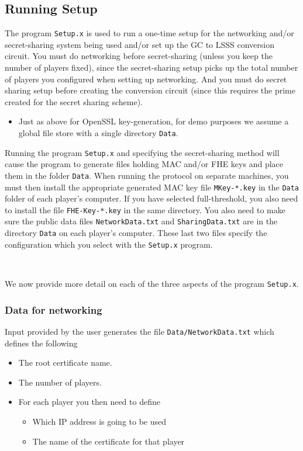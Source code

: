 \subsection{Running Setup}
The program \verb+Setup.x+ is used to run a one-time setup 
for the networking and/or secret-sharing system being used
and/or set up the GC to LSSS conversion circuit.
You must do networking before secret-sharing (unless you keep
the number of players fixed), since the secret-sharing setup
picks up the total number of players you configured when setting
up networking.
And you must do secret sharing setup before creating the conversion
circuit (since this requires the prime created for the secret
sharing scheme).
\begin{itemize}
\item Just as above for OpenSSL key-generation, for demo purposes we assume
a global file store with a single directory \verb+Data+.
\end{itemize}
Running the program \verb+Setup.x+ and specifying the secret-sharing
method will cause the program to generate files holding MAC and/or FHE
keys and place them in the folder \verb+Data+.  When running the
protocol on separate machines, you must then install the appropriate
generated MAC key file \verb+MKey-*.key+ in the \verb+Data+ folder of
each player's computer.  If you have selected full-threshold, you also
need to install the file \verb+FHE-Key-*.key+ in the same directory.
You also need to make sure the public data files
\verb+NetworkData.txt+ and \verb+SharingData.txt+ are in the directory
\verb+Data+ on each player's computer.
These last two files specify the configuration which you select with
the \verb+Setup.x+ program.

~~

\noindent We now provide more detail on each of the three aspects of the program
\verb+Setup.x+.

\subsubsection{Data for networking}
Input provided by the user generates the file
\verb+Data/NetworkData.txt+ which defines the following
\begin{itemize}
\item The root certificate name.
\item The number of players.
\item For each player you then need to define
\begin{itemize}
  \item Which IP address is going to be used
  \item The name of the certificate for that player
\end{itemize}
\iffalse XXXX
\item Whether a fake offline phase is going to be used.
\item Whether a fake sacrifice phase is going to be used.
\fi
\end{itemize}

